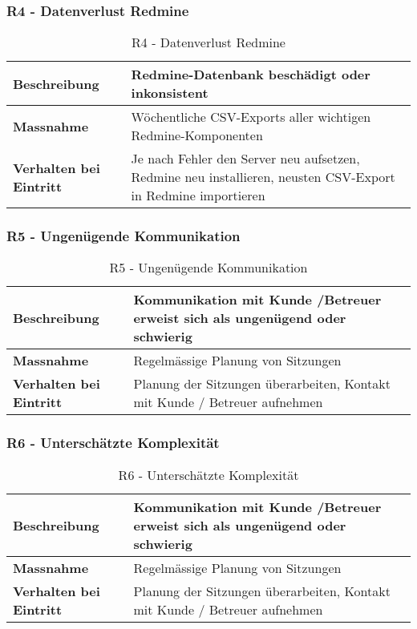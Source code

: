 \subsubsection{R4 - Datenverlust Redmine}
\begin{table}[H]
    \centering
    \def\arraystretch{2}
    \begin{tabular}{| p{4.5cm} | p{13.5cm} |} \hline
        \textbf{Beschreibung} & Redmine-Datenbank beschädigt oder inkonsistent\\ \hline
        \textbf{Massnahme} & Wöchentliche CSV-Exports aller wichtigen Redmine-Komponenten  \\ \hline
        \textbf{Verhalten bei Eintritt} & Je nach Fehler den Server neu aufsetzen, Redmine neu installieren, neusten CSV-Export in Redmine importieren \\ \hline 
    \end{tabular}
    \caption{R4 - Datenverlust Redmine}
\end{table}

\subsubsection{R5 - Ungenügende Kommunikation}
\begin{table}[H]
    \centering
    \def\arraystretch{2}
    \begin{tabular}{| p{4.5cm} | p{13.5cm} |} \hline
        \textbf{Beschreibung} & Kommunikation mit Kunde /Betreuer erweist sich als ungenügend oder schwierig \\ \hline
        \textbf{Massnahme} & Regelmässige Planung von Sitzungen\\ \hline
        \textbf{Verhalten bei Eintritt} & Planung der Sitzungen überarbeiten, Kontakt mit Kunde / Betreuer aufnehmen \\ \hline 
    \end{tabular}
    \caption{R5 - Ungenügende Kommunikation}
\end{table}

\subsubsection{R6 - Unterschätzte Komplexität}
\begin{table}[H]
    \centering
    \def\arraystretch{2}
    \begin{tabular}{| p{4.5cm} | p{13.5cm} |} \hline
        \textbf{Beschreibung} & Kommunikation mit Kunde /Betreuer erweist sich als ungenügend oder schwierig \\ \hline
        \textbf{Massnahme} & Regelmässige Planung von Sitzungen\\ \hline
        \textbf{Verhalten bei Eintritt} & Planung der Sitzungen überarbeiten, Kontakt mit Kunde / Betreuer aufnehmen \\ \hline 
    \end{tabular}
    \caption{R6 - Unterschätzte Komplexität}
\end{table}


